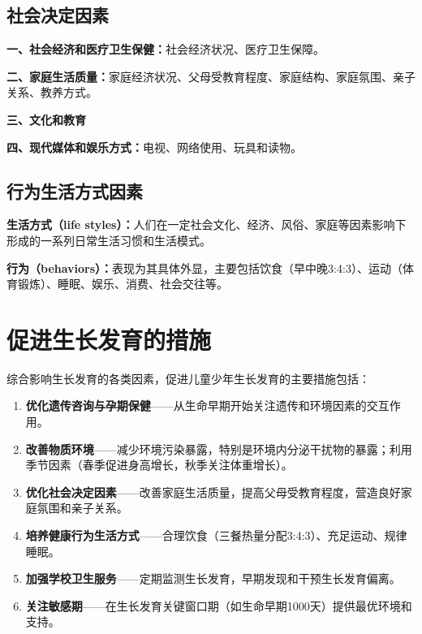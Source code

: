 \subsection{社会决定因素}

\begin{keybox}
\textbf{一、社会经济和医疗卫生保健：}社会经济状况、医疗卫生保障。

\textbf{二、家庭生活质量：}家庭经济状况、父母受教育程度、家庭结构、家庭氛围、亲子关系、教养方式。

\textbf{三、文化和教育}

\textbf{四、现代媒体和娱乐方式：}电视、网络使用、玩具和读物。
\end{keybox}

\subsection{行为生活方式因素}

\begin{defbox}
\textbf{生活方式（life styles）：}人们在一定社会文化、经济、风俗、家庭等因素影响下形成的一系列日常生活习惯和生活模式。

\textbf{行为（behaviors）：}表现为其具体外显，主要包括饮食（早中晚3:4:3）、运动（体育锻炼）、睡眠、娱乐、消费、社会交往等。
\end{defbox}

\section{促进生长发育的措施}

\begin{tipbox}
综合影响生长发育的各类因素，促进儿童少年生长发育的主要措施包括：

\begin{enumerate}[leftmargin=*]
    \item \textbf{优化遗传咨询与孕期保健}——从生命早期开始关注遗传和环境因素的交互作用。
    \item \textbf{改善物质环境}——减少环境污染暴露，特别是环境内分泌干扰物的暴露；利用季节因素（春季促进身高增长，秋季关注体重增长）。
    \item \textbf{优化社会决定因素}——改善家庭生活质量，提高父母受教育程度，营造良好家庭氛围和亲子关系。
    \item \textbf{培养健康行为生活方式}——合理饮食（三餐热量分配3:4:3）、充足运动、规律睡眠。
    \item \textbf{加强学校卫生服务}——定期监测生长发育，早期发现和干预生长发育偏离。
    \item \textbf{关注敏感期}——在生长发育关键窗口期（如生命早期1000天）提供最优环境和支持。
\end{enumerate}
\end{tipbox}

